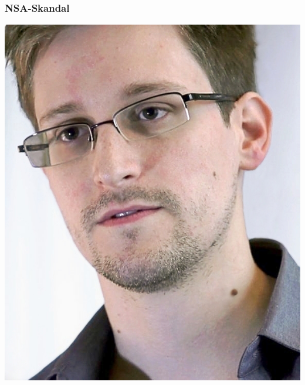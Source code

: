 \documentclass[12pt]{beamer}
\begin{document}
\subsection{}

\begin{frame}
    \frametitle{NSA-Skandal}
    \begin{center}
      \includegraphics[height=0.7\textheight]{img/snowden.jpg}
    \end{center}	
\end{frame}
\end{document}
